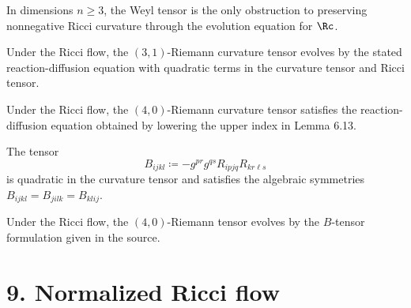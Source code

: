 \begin{remark}
\label{ch06-rem-weyl-obstruction}
In dimensions \(n\ge 3\), the Weyl tensor is the only obstruction to preserving nonnegative Ricci curvature through the evolution equation for \(\Rc\).
\end{remark}

\begin{lemma}
\label{ch06-lem-riemann-curvature-evolution}
Under the Ricci flow, the \((3,1)\)-Riemann curvature tensor evolves by the stated reaction-diffusion equation with quadratic terms in the curvature tensor and Ricci tensor.
\end{lemma}

\begin{corollary}
\label{ch06-cor-riemann-curvature-evolution-four-zero}
Under the Ricci flow, the \((4,0)\)-Riemann curvature tensor satisfies the reaction-diffusion equation obtained by lowering the upper index in Lemma 6.13.
\end{corollary}

\begin{lemma}
\label{ch06-lem-quadratic-tensor-B}
The tensor
\[
B_{ijkl} \coloneqq -g^{pr}g^{qs} R_{ipjq}R_{kr\ell s}
\]
is quadratic in the curvature tensor and satisfies the algebraic symmetries \(B_{ijkl}=B_{jilk}=B_{klij}\).
\end{lemma}

\begin{lemma}
\label{ch06-lem-alternative-riemann-evolution}
Under the Ricci flow, the \((4,0)\)-Riemann tensor evolves by the \(B\)-tensor formulation given in the source.
\end{lemma}

\section*{9. Normalized Ricci flow}

